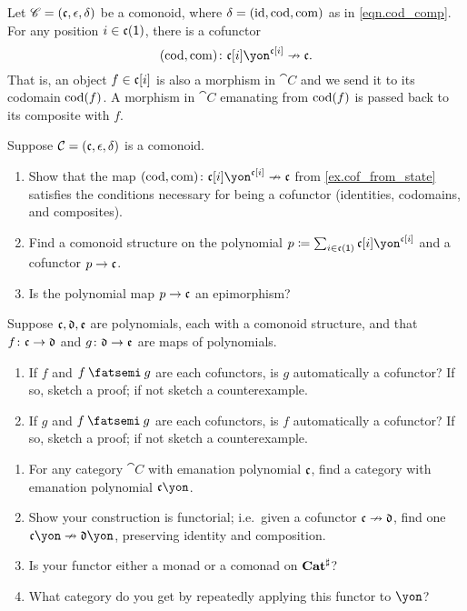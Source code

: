 \documentclass[Book-Poly]{subfiles}
\begin{document}
\begin{example}\label{ex.cof_from_state}
Let $\mathscr{C}=(\mathfrak{c},\epsilon,\delta)$ be a comonoid, where $\delta=(\mathrm{id},\operatorname{cod},\operatorname{com})$ as in \eqref{eqn.cod_comp}. For any position $i\in\mathfrak{c}(\textsf{1})$, there is a cofunctor
\[
	(\cod,\comp)\colon\ema{c}[i]\yon^{\ema{c}[i]}\cof\ema{c}.
\]
That is, an object $f\in \mathfrak{c}[i]$ is also a morphism in $\cat{C}$ and we send it to its codomain $\operatorname{cod}(f)$. A morphism in $\cat{C}$ emanating from $\operatorname{cod}(f)$ is passed back to its composite with $f$. 
\end{example}

\begin{exercise}
Suppose $\mathcal{C}=(\mathfrak{c},\epsilon,\delta)$ is a comonoid.
\begin{enumerate}
	\item Show that the map $(\cod,\comp)\colon\ema{c}[i]\yon^{\ema{c}[i]}\cof\ema{c}$ from \cref{ex.cof_from_state} satisfies the conditions necessary for being a cofunctor (identities, codomains, and composites).
	\item Find a comonoid structure on the polynomial $p\coloneqq\sum_{i\in\ema{c}(\1)}\ema{c}[i]\yon^{\ema{c}[i]}$ and a cofunctor $p\to\mathfrak{c}$.
	\item Is the polynomial map $p\to\mathfrak{c}$ an epimorphism?
\qedhere
\end{enumerate}
\end{exercise}

\begin{exercise}
Suppose $\mathfrak{c},\mathfrak{d},\mathfrak{e}$ are polynomials, each with a comonoid structure, and that $f\colon \mathfrak{c}\to\mathfrak{d}$ and $g\colon\mathfrak{d}\to\mathfrak{e}$ are maps of polynomials.
\begin{enumerate}
	\item If $f$ and $f\then g$ are each cofunctors, is $g$ automatically a cofunctor? If so, sketch a proof; if not sketch a counterexample.
	\item If $g$ and $f\then g$ are each cofunctors, is $f$ automatically a cofunctor? If so, sketch a proof; if not sketch a counterexample.
\qedhere
\end{enumerate}
\end{exercise}

\begin{exercise}
\begin{enumerate}
	\item For any category $\cat{C}$ with emanation polynomial $\mathfrak{c}$, find a category with emanation polynomial $\ema{c}\yon$.
	\item Show your construction is functorial; i.e.\ given a cofunctor $\mathfrak{c}\nrightarrow\mathfrak{d}$, find one $\ema{c}\yon\cof\ema{d}\yon$, preserving identity and composition.
	\item Is your functor either a monad or a comonad on $\mathbf{Cat}^\sharp$?
	\item What category do you get by repeatedly applying this functor to $\yon$?
\qedhere
\end{enumerate}

\end{exercise}
\end{document}
